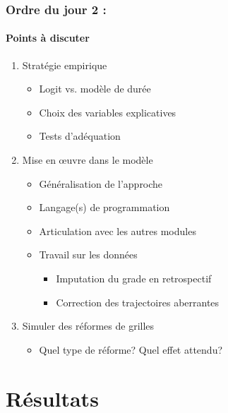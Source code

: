 \documentclass[xcolor=table,ignorenonframetext,12pt]{beamer}
\newenvironment{choixmarges}[2]{\begin{list}{}{%
\setlength{\topsep}{0pt}%
\setlength{\leftmargin}{0pt}%
\setlength{\rightmargin}{0pt}%
\setlength{\listparindent}{\parindent}%
\setlength{\itemindent}{\parindent}%
\setlength{\parsep}{0pt plus 1pt}%
\addtolength{\leftmargin}{#1}%
\addtolength{\rightmargin}{#2}%
}\item }{\end{list}}
\begin{document}
\begin{frame}
\frametitle{Ordre du jour 2 : }
\framesubtitle{Points à discuter} 


\begin{choixmarges}{-0.5cm}{-0.5cm}


\begin{enumerate}

\item Stratégie empirique
	\begin{itemize}
	\item Logit vs. modèle de durée
	\item Choix des variables explicatives
	\item Tests d'adéquation
	\end{itemize}
	
\vspace{0.2cm}	
\item Mise en \oe uvre dans le modèle
	\begin{itemize}
	\item Généralisation de l'approche
	\item Langage(s) de programmation
	\item Articulation avec les autres modules
	\item Travail sur les données
		\begin{itemize}
		\item Imputation du grade en retrospectif
		\item Correction des trajectoires aberrantes 
		\end{itemize}
	\end{itemize}

\vspace{0.2cm}
\item Simuler des réformes de grilles
	\begin{itemize}
	\item Quel type de réforme? Quel effet attendu? 
	\end{itemize}



\end{enumerate}

\end{choixmarges}
\end{frame}



\section{Résultats}
\end{document}

